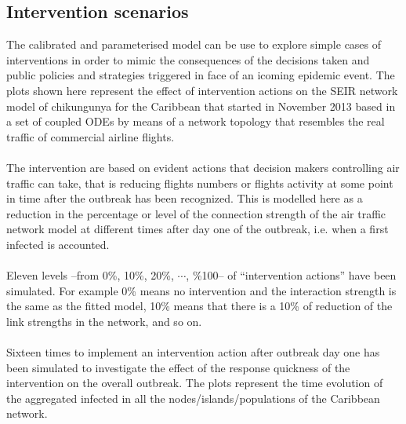 \documentclass[10pt,a4paper]{article}
\begin{document}
\subsection*{Intervention scenarios}
The calibrated and parameterised model can be use to explore simple cases of interventions in order to mimic the consequences of the decisions taken and public policies and strategies triggered in face of an icoming epidemic event.   
The plots shown here represent the effect of intervention actions on the SEIR network model of chikungunya for the Caribbean that started in November 2013 based in a set of coupled ODEs by means of a network topology that resembles the real traffic of commercial airline flights. 
\\\\
The intervention are based on evident actions that decision makers controlling air traffic can take, that is reducing flights numbers or flights activity at some point in time after the outbreak has been recognized. This is modelled here as a reduction in the percentage or level of the connection strength of the air traffic network model at different times after day one of the outbreak, i.e. when a first infected is accounted. 
\\\\
Eleven levels --from 0\%, 10\%, 20\%, $\cdots$, \%100-- of ``intervention actions'' have been simulated. For example 0\% means no intervention and the interaction strength is the same as the fitted model, 10\% means that there is a 10\% of reduction of the link strengths in the network, and so on.
\\\\
Sixteen times to implement an intervention action after outbreak day one has been simulated to investigate the effect of the response quickness of the intervention on the overall outbreak. The plots represent the time evolution of the aggregated infected in all the nodes/islands/populations of the Caribbean network.
\end{document}
